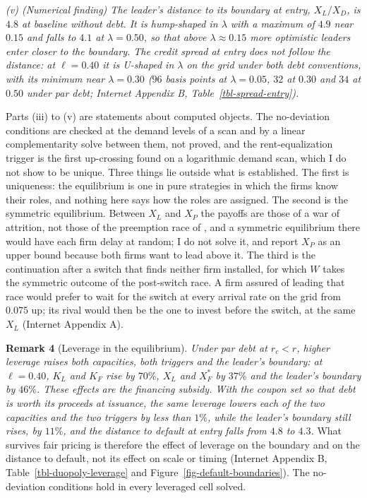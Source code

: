 \documentclass[
  11pt,
  letterpaper,
]{scrartcl}
\begin{document}
\emph{(v) (Numerical finding) The leader's distance to its boundary at
entry, \(X_L/X_D\), is \(4.8\) at baseline without debt. It is
hump-shaped in \(\lambda\) with a maximum of \(4.9\) near \(0.15\) and
falls to \(4.1\) at \(\lambda = 0.50\), so that above
\(\lambda \approx 0.15\) more optimistic leaders enter closer to the
boundary. The credit spread at entry does not follow the distance: at
\(\ell = 0.40\) it is U-shaped in \(\lambda\) on the grid under both
debt conventions, with its minimum near \(\lambda = 0.30\) (\(96\) basis
points at \(\lambda = 0.05\), \(32\) at \(0.30\) and \(34\) at \(0.50\)
under par debt; Internet Appendix B, Table~\ref{tbl-spread-entry}).}

Parts (iii) to (v) are statements about computed objects. The
no-deviation conditions are checked at the demand levels of a scan and
by a linear complementarity solve between them, not proved, and the
rent-equalization trigger is the first up-crossing found on a
logarithmic demand scan, which I do not show to be unique. Three things
lie outside what is established. The first is uniqueness: the
equilibrium is one in pure strategies in which the firms know their
roles, and nothing here says how the roles are assigned. The second is
the symmetric equilibrium. Between \(X_L\) and \(X_P\) the payoffs are
those of a war of attrition, not those of the preemption race of
\citet{fudenberg1985preemption}, and a symmetric equilibrium there would
have each firm delay at random; I do not solve it, and report \(X_P\) as
an upper bound because both firms want to lead above it. The third is
the continuation after a switch that finds neither firm installed, for
which \(W\) takes the symmetric outcome of the post-switch race. A firm
assured of leading that race would prefer to wait for the switch at
every arrival rate on the grid from \(0.075\) up; its rival would then
be the one to invest before the switch, at the same \(X_L\) (Internet
Appendix A).

\textbf{Remark 4} (Leverage in the equilibrium). \emph{Under par debt at
\(r_c < r\), higher leverage raises both capacities, both triggers and
the leader's boundary: at \(\ell = 0.40\), \(K_L\) and \(K_F\) rise by
\(70\%\), \(X_L\) and \(X_F^*\) by \(37\%\) and the leader's boundary by
\(46\%\). These effects are the financing subsidy. With the coupon set
so that debt is worth its proceeds at issuance, the same leverage lowers
each of the two capacities and the two triggers by less than \(1\%\),
while the leader's boundary still rises, by \(11\%\), and the distance
to default at entry falls from \(4.8\) to \(4.3\).} What survives fair
pricing is therefore the effect of leverage on the boundary and on the
distance to default, not its effect on scale or timing (Internet
Appendix B, Table~\ref{tbl-duopoly-leverage} and
Figure~\ref{fig-default-boundaries}). The no-deviation conditions hold
in every leveraged cell solved.
\end{document}
